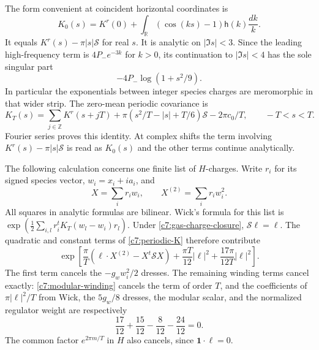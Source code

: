 The form convenient at coincident horizontal coordinates is
\begin{equation}\label{c7:K0}
K_0(s)=K^r(0)+\int_{\mathbb R}(\cos(ks)-1)\mathsf h(k)\frac{dk}{k}.
\end{equation}
It equals $K^r(s)-\pi|s|\mathcal S$ for real $s$.  It is analytic on
$|\Im s|<3$.  Since the leading high-frequency term is $4P_-e^{-3k}$ for
$k>0$, its continuation to $|\Im s|<4$ has the sole singular part
\begin{equation}\label{c7:K0-singular}
-4P_-\log(1+s^2/9).
\end{equation}
In particular the exponentials between integer species charges are
meromorphic in that wider strip.  The zero-mean periodic covariance is
\begin{equation}\label{c7:periodic-K}
K_T(s)=\sum_{j\in\mathbb Z}K^r(s+jT)
 +\pi(s^2/T-|s|+T/6)\mathcal S-2\pi c_0/T,
\qquad -T<s<T.
\end{equation}
Fourier series proves this identity.  At complex shifts the term involving
$K^r(s)-\pi|s|\mathcal S$ is read as $K_0(s)$ and the other terms continue
analytically.

The following calculation concerns one finite list of $H$-charges.  Write
$r_i$ for its signed species vector, $w_i=x_i+ia_i$, and
\[
X=\sum_i r_iw_i,\qquad X^{(2)}=\sum_i r_iw_i^2.
\]
All squares in analytic formulas are bilinear.  Wick's formula for this
list is $\exp(\tfrac12\sum_{i,l}r_i^tK_T(w_l-w_i)r_l)$.  Under
\eqref{c7:gas-charge-closure}, $\mathcal S\boldsymbol\ell=\boldsymbol\ell$.
The quadratic and constant terms of \eqref{c7:periodic-K} therefore
contribute
\begin{equation}\label{c7:wick-quadratic}
\exp\!\left[
\frac\pi T(\boldsymbol\ell\cdot X^{(2)}-X^t\mathcal S X)
+\frac{\pi T}{12}|\boldsymbol\ell|^2
+\frac{17\pi}{12T}|\boldsymbol\ell|^2\right].
\end{equation}
The first term cancels the $-g_ww_i^2/2$ dresses.  The remaining winding
terms cancel exactly: \eqref{c7:modular-winding} cancels the term of order
$T$, and the coefficients of $\pi|\boldsymbol\ell|^2/T$ from Wick, the
$5g_w/8$ dresses, the modular scalar, and the normalized regulator weight
are respectively
\[
\frac{17}{12}+\frac{15}{12}-\frac8{12}-\frac{24}{12}=0.
\]
The common factor $e^{2\pi m/T}$ in $H$ also cancels, since
$\mathbf1\cdot\boldsymbol\ell=0$.

